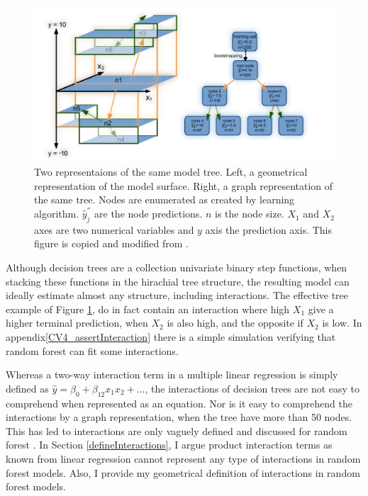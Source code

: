 \begin{figure}[!htbp]
\includegraphics[width=\textwidth,height=\textheight,keepaspectratio]{graphics/randomForest_explained_thesisVersion.pdf}
\caption{Two representaions of the same model tree. Left, a geometrical representation of the model surface. Right, a graph representation of the same tree. Nodes are enumerated as created by learning algorithm. $\hat{y}^{''}_j$ are the node predictions. $n$ is the node size. $X_1$ and $X_2$ axes are two numerical variables and $y$ axis the prediction axis. This figure is copied and modified from \cite{welling2016forest}.}
\label{simpleTree}
\end{figure}

Although decision trees are a collection univariate binary step functions, when stacking these functions in the hirachial tree structure, the resulting model can ideally estimate almost any structure, including interactions. The effective tree example of Figure \ref{simpleTree}, do in fact contain an interaction where high $X_1$ give a higher terminal prediction, when $X_2$ is also high, and the opposite if $X_2$ is low. In appendix\ref{CV4_assertInteraction} there is a simple simulation verifying that random forest can fit some interactions.

Whereas a two-way interaction term in a multiple linear regression is simply defined as  $\hat{y} = \beta_0 + \beta_{12} x_1 x_2 + ...$, the interactions of decision trees are not easy to comprehend when represented as an equation. Nor is it easy to comprehend the interactions by a graph representation, when the tree have more than 50 nodes. This has led to interactions are only vaguely defined and discussed for random forest \cite{boulesteix2014letter}. In Section \ref{defineInteractions}, I argue product interaction terms as known from linear regression cannot represent any type of interactions in random forest models. Also, I provide my geometrical definition of interactions in random forest models.

